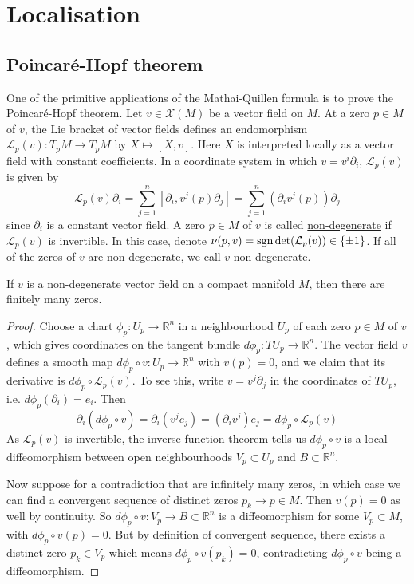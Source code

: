 \chapter{Localisation}
\label{chapter_local}
\section{Poincar\'e-Hopf theorem}
One of the primitive applications of the Mathai-Quillen formula is to prove the
Poincar\'e-Hopf theorem. 
Let $v\in\mathcal{X}(M)$ be a vector field on $M$.
At a zero $p\in M$ of  $v$, the Lie bracket of vector fields defines an endomorphism 
$\mathcal{L}_p(v) : T_pM \to T_pM$ by  $X\mapsto [X,v]$. Here $X$ is 
interpreted locally as a vector field with constant coefficients. 
In a coordinate system in
which $v= v^i \partial_i$, $\mathcal{L}_p(v)$ is given by 
 \[
	 \mathcal{L}_p(v)\partial_i = \sum_{j=1}^{n} [\partial_i, v^j(p)\partial_j] 
	 = \sum_{j=1}^{n} (\partial_i v^j(p)) \partial_j
\] 
since $\partial_i$ is a constant vector field. 
A zero $p\in M$ of $v$ is called \underline{non-degenerate} if  $\mathcal{L}_p(v)$ is
invertible. In this case, denote $\nu(p,v) = \operatorname{sgn} \det(\mathcal{L}_p(v)) 
\in \{\pm 1\}$. If all of the zeros of $v$ are non-degenerate, we call  $v$
non-degenerate. 

\begin{lem}
If $v$ is a non-degenerate vector field on a compact manifold  $M$, then there
are finitely many zeros. 
\end{lem}
\begin{proof}
	Choose a chart $\phi_p : U_p \to \mathbb{R}^n$ in a neighbourhood $U_p$ of
	each zero $p\in M$ of $v$, which gives coordinates on the tangent bundle 
	$d\phi_p : TU_p \to \mathbb{R}^n$. The vector field $v$ defines a
	smooth map $d\phi_p \circ v : U_p\to \mathbb{R}^n$ 
	with $v(p) = 0$, and we claim that its derivative is $d\phi_p\circ \mathcal{L}_p(v)$. 
	To see this, write $v = v^j\partial_j$ in the coordinates of $TU_p$, i.e.
	$d\phi_p(\partial_i) = e_i$. Then 
	\[
	\partial_i(d\phi_p \circ v)
	= \partial_i( v^j e_j)
	= (\partial_i v^j) e_j
	= d\phi_p\circ \mathcal{L}_p(v)
	\] 
	As $\mathcal{L}_p(v)$ is invertible, the inverse function theorem tells us 
	$d\phi_p \circ v$ is a local diffeomorphism
	between open neighbourhoods $V_p \subset U_p$ and $B \subset \mathbb{R}^n$. 

	Now suppose for a contradiction that are infinitely many zeros, in which
	case we can find a convergent sequence of distinct zeros $p_k \to p \in M$. Then
	$v(p)=0$ as well by continuity. So $d\phi_p\circ v : V_p \to B \subset
	\mathbb{R}^n$ is a diffeomorphism for some $V_p \subset M$, with 
	$d\phi_p\circ v(p) = 0$. But by definition of convergent sequence, there
	exists a distinct zero $p_k \in V_p$ which means $d\phi_p\circ v(p_k) = 0$,
	contradicting  $d\phi_p\circ v$ being a diffeomorphism.
\end{proof}


